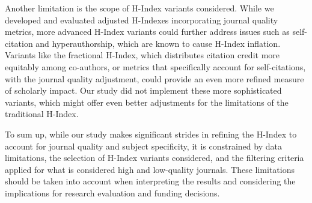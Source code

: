 Another limitation is the scope of H-Index variants considered. While we
developed and evaluated adjusted H-Indexes incorporating journal quality
metrics, more advanced H-Index variants could further address issues such as
self-citation and hyperauthorship, which are known to cause H-Index inflation.
Variants like the fractional H-Index, which distributes citation credit more
equitably among co-authors, or metrics that specifically account for
self-citations, with the journal quality adjustment, could provide an even more
refined measure of scholarly impact. Our study did not implement these more
sophisticated variants, which might offer even better adjustments for the
limitations of the traditional H-Index.

To sum up, while our study makes significant strides in refining the H-Index to
account for journal quality and subject specificity, it is constrained by data
limitations, the selection of H-Index variants considered, and the filtering
criteria applied for what is considered high and low-quality journals. These
limitations should be taken into account when interpreting the results and
considering the implications for research evaluation and funding decisions.
